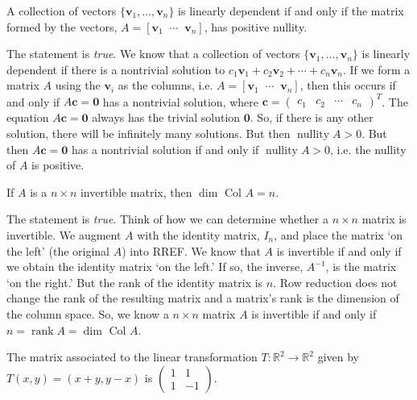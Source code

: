 \documentclass[11pt,letterpaper]{article}
\DeclareMathOperator{\rank}{rank}
\DeclareMathOperator{\nullity}{nullity}
\begin{document}
 A collection of vectors $\{ \mathbf{v}_1, \ldots, \mathbf{v}_n \}$ is linearly dependent if and only if the matrix formed by the vectors, $A= [ \mathbf{v}_1 \;\;\cdots\;\; \mathbf{v}_n]$, has positive nullity. \pspace

\sol The statement is \textit{true}. We know that a collection of vectors $\{ \mathbf{v}_1, \ldots, \mathbf{v}_n \}$ is linearly dependent if there is a nontrivial solution to $c_1 \mathbf{v}_1 + c_2 \mathbf{v}_2 + \cdots +  c_n \mathbf{v}_n$. If we form a matrix $A$ using the $\mathbf{v}_i$ as the columns, i.e. $A= [ \mathbf{v}_1 \;\;\cdots\;\; \mathbf{v}_n]$, then this occurs if and only if $A\mathbf{c}= \mathbf{0}$ has a nontrivial solution, where $\mathbf{c}= \begin{pmatrix} c_1 & c_2 & \cdots & c_n \end{pmatrix}^T$. The equation $A\mathbf{c}= \mathbf{0}$ always has the trivial solution $\mathbf{0}$. So, if there is any other solution, there will be infinitely many solutions. But then $\nullity A > 0$. But then $A\mathbf{c}= \mathbf{0}$ has a nontrivial solution if and only if $\nullity A > 0$, i.e. the nullity of $A$ is positive. \pvspace{1.3cm}



 If $A$ is a $n \times n$ invertible matrix, then $\dim \text{ Col } A= n$. \pspace

\sol The statement is \textit{true}. Think of how we can determine whether a $n \times n$ matrix is invertible. We augment $A$ with the identity matrix, $I_n$, and place the matrix `on the left' (the original $A$) into RREF. We know that $A$ is invertible if and only if we obtain the identity matrix `on the left.' If so, the inverse, $A^{-1}$, is the matrix `on the right.' But the rank of the identity matrix is $n$. Row reduction does not change the rank of the resulting matrix and a matrix's rank is the dimension of the column space. So, we know a $n \times n$ matrix $A$ is invertible if and only if $n= \rank A= \dim \text{ Col }A$. \pvspace{1.3cm}



 The matrix associated to the linear transformation $T: \mathbb{R}^2 \to \mathbb{R}^2$ given by $T(x, y)= (x + y, y - x)$ is $\begin{pmatrix} 1 & 1 \\ 1 & -1 \end{pmatrix}$. \pspace
\end{document}
